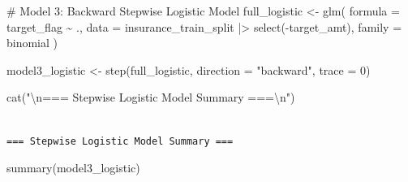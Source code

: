 \documentclass[
  11pt]{article}
\newenvironment{Shaded}{\begin{snugshade}}{\end{snugshade}}
\newcommand{\AttributeTok}[1]{\textcolor[rgb]{0.40,0.45,0.13}{#1}}
\newcommand{\CommentTok}[1]{\textcolor[rgb]{0.37,0.37,0.37}{#1}}
\newcommand{\DecValTok}[1]{\textcolor[rgb]{0.68,0.00,0.00}{#1}}
\newcommand{\FunctionTok}[1]{\textcolor[rgb]{0.28,0.35,0.67}{#1}}
\newcommand{\NormalTok}[1]{\textcolor[rgb]{0.00,0.23,0.31}{#1}}
\newcommand{\OtherTok}[1]{\textcolor[rgb]{0.00,0.23,0.31}{#1}}
\newcommand{\SpecialCharTok}[1]{\textcolor[rgb]{0.37,0.37,0.37}{#1}}
\newcommand{\StringTok}[1]{\textcolor[rgb]{0.13,0.47,0.30}{#1}}
\begin{document}
\begin{Shaded}
\begin{Highlighting}[]
\CommentTok{\# Model 3: Backward Stepwise Logistic Model}
\NormalTok{full\_logistic }\OtherTok{\textless{}{-}} \FunctionTok{glm}\NormalTok{(}
    \AttributeTok{formula =}\NormalTok{ target\_flag }\SpecialCharTok{\textasciitilde{}}\NormalTok{ .,}
    \AttributeTok{data =}\NormalTok{ insurance\_train\_split }\SpecialCharTok{|\textgreater{}} \FunctionTok{select}\NormalTok{(}\SpecialCharTok{{-}}\NormalTok{target\_amt),}
    \AttributeTok{family =}\NormalTok{ binomial}
\NormalTok{)}

\NormalTok{model3\_logistic }\OtherTok{\textless{}{-}} \FunctionTok{step}\NormalTok{(full\_logistic, }\AttributeTok{direction =} \StringTok{"backward"}\NormalTok{, }\AttributeTok{trace =} \DecValTok{0}\NormalTok{)}

\FunctionTok{cat}\NormalTok{(}\StringTok{"}\SpecialCharTok{\textbackslash{}n}\StringTok{=== Stepwise Logistic Model Summary ===}\SpecialCharTok{\textbackslash{}n}\StringTok{"}\NormalTok{)}
\end{Highlighting}
\end{Shaded}

\begin{verbatim}

=== Stepwise Logistic Model Summary ===
\end{verbatim}

\begin{Shaded}
\begin{Highlighting}[]
\FunctionTok{summary}\NormalTok{(model3\_logistic)}
\end{Highlighting}
\end{Shaded}
\end{document}
